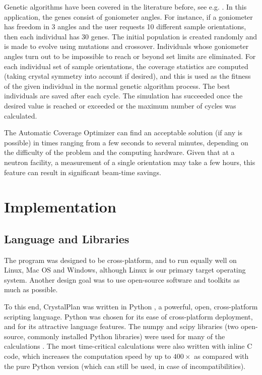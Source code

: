 \documentclass[final]{iucr}              %
\begin{document}
Genetic algorithms have been covered in the literature before, see e.g.
\cite{Goldberg89}. In this application, the genes
consist of goniometer angles. For instance, if a goniometer has freedom in 3 angles and the user
requests 10 different sample orientations, then each individual has 30 genes.
The initial population is created randomly and is made to evolve using mutations
and crossover. Individuals whose goniometer angles turn out to be impossible to
reach or beyond set limits are eliminated. For each individual set of sample
orientations, the coverage statistics are computed (taking crystal symmetry into
account if desired), and this is used as the fitness of the given individual in
the normal genetic algorithm process. The best individuals are saved after each
cycle. The simulation has succeeded once the desired value is reached or
exceeded or the maximum number of cycles was calculated.    

The Automatic Coverage Optimizer can find an acceptable solution (if any is
possible) in times ranging from a few seconds to several minutes, depending on
the difficulty of the problem and the computing hardware. Given that at a
neutron facility, a measurement of a single orientation may take a few
hours, this feature can result in significant beam-time savings.           




\section{Implementation}




\subsection{Language and Libraries}

The program was designed to be cross-platform, and to run equally well on Linux,
Mac OS and Windows, although Linux is our primary target operating system. Another
design goal was to use open-source software and toolkits as much as possible. 

To this end, CrystalPlan was written in Python \cite{python}, a powerful, open,
cross-platform scripting language. Python was chosen for its ease of cross-platform deployment, and for
its attractive language features. The numpy and scipy libraries (two
open-source, commonly installed Python libraries) were used for many of the
calculations \cite{numpy,scipy}. The most time-critical calculations
were also written with inline C code, which increases the computation speed by
up to $400\times$ as compared with the pure Python version (which can still be
used, in case of incompatibilities).
\end{document}
